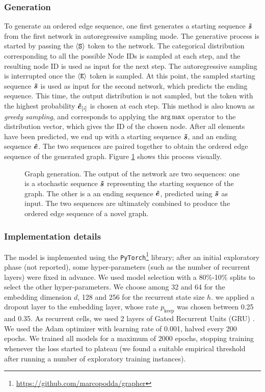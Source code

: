 \subsubsection*{Generation}
To generate an ordered edge sequence, one first generates a starting sequence $\Vector{\tilde{s}}$ from the first network in autoregressive sampling mode. The generative process is started by passing the $\mathtt{\langle S \rangle}$ token to the network. The categorical distribution corresponding to all the possible Node IDs is sampled at each step, and the resulting node ID is used as input for the next step. The autoregressive sampling is interrupted once the $\mathtt{\langle E \rangle}$ token is sampled. At this point, the sampled starting sequence $\Vector{\tilde{s}}$ is used as input for the second network, which predicts the ending sequence. This time, the output distribution is not sampled, but the token with the highest probability $\Elem{\hat{e}}{i}$ is chosen at each step. This method is also known as \emph{greedy sampling}, and corresponds to applying the $\argmax$ operator to the distribution vector, which gives the ID of the chosen node. After all elements have been predicted, we end up with a starting sequence $\Vector{\tilde{s}}$, and an ending sequence $\Vector{\hat{e}}$. The two sequences are paired together to obtain the ordered edge sequence of the generated graph. Figure \ref{fig:model-sampling} shows this process visually.
\begin{figure}[h!]
    \centering
    \resizebox{.8\textwidth}{!}{}
    \caption{Graph generation. The output of the network are two sequences: one is a stochastic sequence $\Vector{\tilde{s}}$ representing the starting sequence of the graph. The other is a an ending sequence $\Vector{\hat{e}}$, predicted using $\Vector{\tilde{s}}$ as input. The two sequences are ultimately combined to produce the ordered edge sequence of a novel graph.}
    \label{fig:model-sampling}
\end{figure}

\subsubsection*{Implementation details}\label{sec:implementation}
The model is implemented using the \texttt{PyTorch}\footnote{\url{https://github.com/marcopodda/grapher}} \cite{paszke2017pytorch} library; after an initial exploratory phase (not reported), some hyper-parameters (such as the number of recurrent layers) were fixed in advance. We used model selection with a 80\%-10\% splits to select the other hyper-parameters. We choose among 32 and 64 for the embedding dimension $d$, 128 and 256 for the recurrent state size $h$. we applied a dropout layer to the embedding layer, whose rate $p_{\mathrm{keep}}$ was chosen between 0.25 and 0.35. As recurrent cells, we used 2 layers of Gated Recurrent Units (GRU) \cite{cho2014gru}. We used the Adam \cite{kingma2015adam} optimizer with learning rate of 0.001, halved every 200 epochs. We trained all models for a maximum of 2000 epochs, stopping training whenever the loss started to plateau (we found a suitable empirical threshold after running a number of exploratory training instances).

